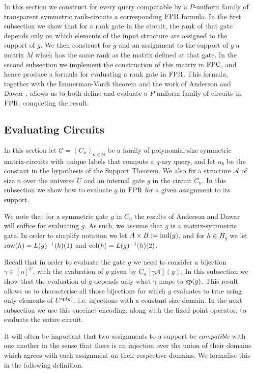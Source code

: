 \documentclass[../paper.tex]{subfiles}
\begin{document}
In this section we construct for every query computable by a $P$-uniform family
of transparent symmetric rank-circuits a corresponding $\text{\upshape FPR}$ formula. In the
first subsection we show that for a rank gate in the circuit, the rank of that
gate depends only on which elements of the input structure are assigned to the
support of $g$. We then construct for $g$ and an assignment to the support of
$g$ a matrix $M$ which has the same rank as the matrix defined at that gate. In
the second subsection we implement the construction of this matrix in $\text{\upshape FPC}$,
and hence produce a formula for evaluating a rank gate in $\text{\upshape FPR}$. This formula,
together with the Immerman-Vardi theorem and the work of Anderson and Dawar
\cite{AndersonD17}, allows us to both define and evaluate a $P$-uniform family
of circuits in $\text{\upshape FPR}$, completing the result.

\subsection {Evaluating Circuits}
In this section let $\mathcal{C} = (C_n)_{n \in \mathbb{N}}$ be a family of
polynomial-size symmetric matrix-circuits with unique labels that compute a
$q$-ary query, and let $n_0$ be the constant in the hypothesis of the Support
Theorem. We also fix a structure $\mathcal{A}$ of size $n$ over the universe $U$
and an internal gate $g$ in the circuit $C_n$. In this subsection we show how to
evaluate $g$ in $\text{\upshape FPR}$ for a given assignment to its support.

We note that for a symmetric gate $g$ in $C_n$ the results of Anderson and
Dawar~\cite{AndersonD17} will suffice for evaluating $g$. As such, we assume
that $g$ is a matrix-symmetric gate. In order to simplify notation we let $A
\times B := \text{\upshape ind}(g)$, and for $h \in H_g$ we let $\text{row}(h) = L(g)^{-1}(h)(1)$ and
$\text{col}(h) = L(g)^{-1}(h)(2)$.

Recall that in order to evaluate the gate $g$ we need to consider a bijection
$\gamma \in [n]^{\underline{U}}$, with the evaluation of $g$ given by
$C_n[\gamma \mathcal{A}](g)$. In this subsection we show that the evaluation of
$g$ depends only what $\gamma$ maps to $\text{sp}(g)$. This result allows us to
characterise all those bijections for which $g$ evaluates to true using only
elements of $U^{\text{sp}(g)}$, i.e. injections with a constant size domain. In the
next subsection we use this succinct encoding, along with the fixed-point
operator, to evaluate the entire circuit.
 
It will often be important that two assignments to a support be
\emph{compatible} with one another in the sense that there is an injection over
the union of their domains which agrees with each assignment on their respective
domains. We formalise this in the following definition.
\end{document}
